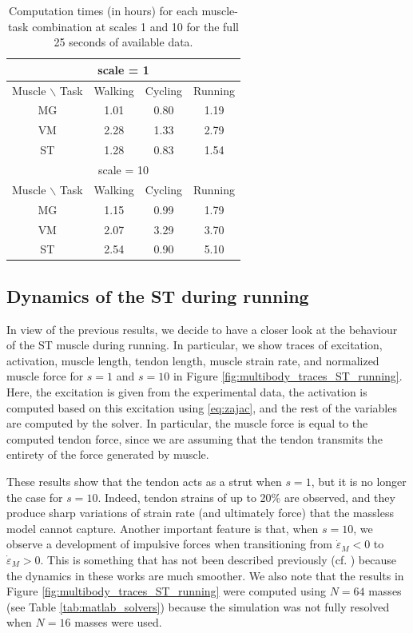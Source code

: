 \documentclass{sfuthesis}
\numberwithin{equation}{chapter}
\numberwithin{figure}{chapter}
\numberwithin{table}{chapter}
\theoremstyle{definition}
\newcommand{\depsilon}{\dot{\varepsilon}}
\begin{document}
\begin{table} 
    \centering
    \begin{tabular}{|c|c|c|c|}\hline
        \multicolumn{4}{|c|}{scale = 1} \\\hline
        Muscle $\backslash$ Task & Walking & Cycling & Running \\\hline
        MG & 1.01 & 0.80 & 1.19 \\\hline
        VM & 2.28 & 1.33 & 2.79 \\\hline
        ST & 1.28 & 0.83 & 1.54 \\\hline\hline
        \multicolumn{4}{|c|}{scale = 10} \\\hline
        Muscle $\backslash$ Task & Walking & Cycling & Running \\\hline
        MG & 1.15 & 0.99 & 1.79 \\\hline
        VM & 2.07 & 3.29 & 3.70 \\\hline
        ST & 2.54 & 0.90 & 5.10 \\\hline
    \end{tabular}
    \caption{Computation times (in hours) for each muscle-task combination at scales 1 and 10 for the full 25 seconds of available data.}
    \label{tab:multibody_computational_time}
\end{table}

\subsection{Dynamics of the ST during running}

In view of the previous results, we decide to have a closer look at the behaviour of the ST muscle during running. In particular, we show traces of excitation, activation, muscle length, tendon length, muscle strain rate, and normalized muscle force for $s=1$ and $s=10$ in Figure \ref{fig:multibody_traces_ST_running}. Here, the excitation is given from the experimental data, the activation is computed based on this excitation using \eqref{eq:zajac}, and the rest of the variables are computed by the solver. In particular, the muscle force is equal to the computed tendon force, since we are assuming that the tendon transmits the entirety of the force generated by muscle. 

These results show that the tendon acts as a strut when $s=1$, but it is no longer the case for $s=10$. Indeed, tendon strains of up to 20\% are observed, and they produce sharp variations of strain rate (and ultimately force) that the massless model cannot capture. Another important feature is that, when $s=10$, we observe a development of impulsive forces when transitioning from $\depsilon_M < 0$ to $\depsilon_M > 0$. This is something that has not been described previously (cf. \cite{EvanThesis,Ross2018}) because the dynamics in these works are much smoother. We also note that the results in Figure \ref{fig:multibody_traces_ST_running} were computed using $N=64$ masses (see Table \ref{tab:matlab_solvers}) because the simulation was not fully resolved when $N=16$ masses were used. 
\end{document}
